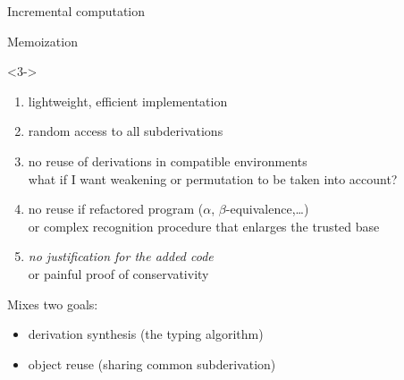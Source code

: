 \documentclass{beamer}
\theoremstyle{example}
\begin{document}
\begin{frame}[fragile]{Incremental computation}
\begin{block}{Memoization}
\begin{overlayarea}{\textwidth}{.7\textheight}
    \begin{onlyenv}<3->
      \begin{enumerate}
      \item[\itplus] lightweight, efficient implementation
      \item[\itplus] random access to all subderivations
      \item [\itminus] no reuse of derivations in compatible
        environments \\
        {\footnotesize what if I want \eg weakening or
          permutation to be taken into account?}
      \item[\itminus] no reuse if refactored program ($\alpha$,
        $\beta$-equivalence,\ldots) \\
        {\footnotesize or complex recognition procedure that enlarges
          the trusted base}
      \item[\itminus] {\large\it no justification for the added code} \\
        {\footnotesize or painful proof of conservativity}
      \end{enumerate}

      {\footnotesize Mixes two goals:}

      \begin{itemize}
      \item {\large derivation synthesis} \footnotesize (the typing algorithm)
      \item {\large object reuse} \footnotesize (sharing common subderivation)
      \end{itemize}
    \end{onlyenv}
    \end{overlayarea}
\end{block}
\end{frame}

\end{document}
